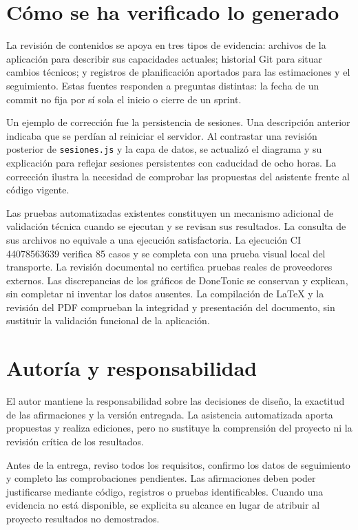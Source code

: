 \section{Cómo se ha verificado lo generado}
La revisión de contenidos se apoya en tres tipos de evidencia: archivos de la aplicación para describir sus capacidades actuales; historial Git para situar cambios técnicos; y registros de planificación aportados para las estimaciones y el seguimiento. Estas fuentes responden a preguntas distintas: la fecha de un commit no fija por sí sola el inicio o cierre de un sprint.

Un ejemplo de corrección fue la persistencia de sesiones. Una descripción anterior indicaba que se perdían al reiniciar el servidor. Al contrastar una revisión posterior de \texttt{sesiones.js} y la capa de datos, se actualizó el diagrama y su explicación para reflejar sesiones persistentes con caducidad de ocho horas. La corrección ilustra la necesidad de comprobar las propuestas del asistente frente al código vigente.

Las pruebas automatizadas existentes constituyen un mecanismo adicional de validación técnica cuando se ejecutan y se revisan sus resultados. La consulta de sus archivos no equivale a una ejecución satisfactoria. La ejecución CI 44078563639 verifica 85 casos y se completa con una prueba visual local del transporte. La revisión documental no certifica pruebas reales de proveedores externos. Las discrepancias de los gráficos de DoneTonic se conservan y explican, sin completar ni inventar los datos ausentes. La compilación de LaTeX y la revisión del PDF comprueban la integridad y presentación del documento, sin sustituir la validación funcional de la aplicación.

\section{Autoría y responsabilidad}
El autor mantiene la responsabilidad sobre las decisiones de diseño, la exactitud de las afirmaciones y la versión entregada. La asistencia automatizada aporta propuestas y realiza ediciones, pero no sustituye la comprensión del proyecto ni la revisión crítica de los resultados.

Antes de la entrega, reviso todos los requisitos, confirmo los datos de seguimiento y completo las comprobaciones pendientes. Las afirmaciones deben poder justificarse mediante código, registros o pruebas identificables. Cuando una evidencia no está disponible, se explicita su alcance en lugar de atribuir al proyecto resultados no demostrados.
